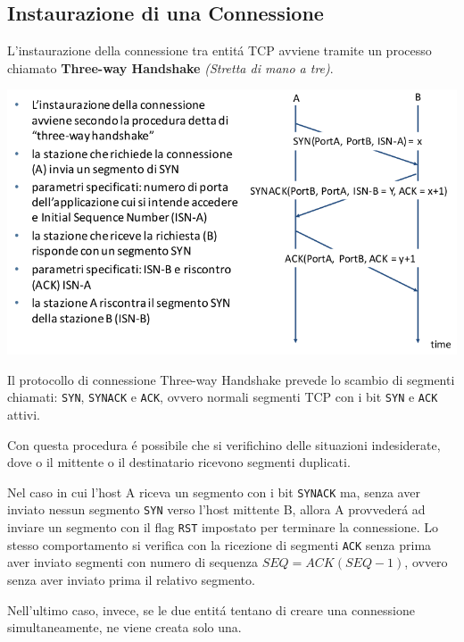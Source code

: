 \documentclass[12pt]{article}
\def\code#1{\texttt{#1}}
\begin{document}
\subsection{Instaurazione di una Connessione}\label{tcp-instaurazione-connessione}
L'instaurazione della connessione tra entit\'a TCP avviene tramite un processo chiamato \textbf{Three-way 
Handshake} \textit{(Stretta di mano a tre)}.

\begin{center}
	\includegraphics[scale=0.45]{livello_trasporto-img3.png}
\end{center}

Il protocollo di connessione Three-way Handshake prevede lo scambio di segmenti chiamati: \code{SYN}, \code{SYNACK} 
e \code{ACK}, ovvero normali segmenti TCP con i bit \code{SYN} e \code{ACK} attivi.

Con questa procedura \'e possibile che si verifichino delle situazioni indesiderate, dove o il mittente o il 
destinatario ricevono segmenti duplicati.

Nel caso in cui l'host A riceva un segmento con i bit \code{SYNACK} ma, senza aver inviato nessun segmento 
\code{SYN} verso l'host mittente B, allora A provveder\'a ad inviare un segmento con il flag \code{RST} impostato 
per terminare la connessione. Lo stesso comportamento si verifica con la ricezione di segmenti \code{ACK} senza 
prima aver inviato segmenti con numero di sequenza $SEQ=ACK(SEQ-1)$, ovvero senza aver inviato prima il relativo 
segmento.

Nell'ultimo caso, invece, se le due entit\'a tentano di creare una connessione simultaneamente, ne viene creata solo 
una.
\end{document}
